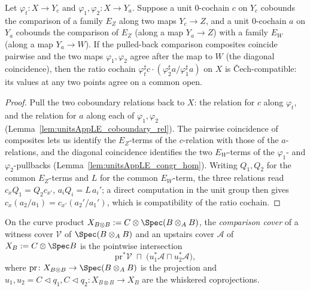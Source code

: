 \begin{lemma}
  \label{lem:ratio_compat}
  \leanok
  Let \(\varphi_t \colon X \to Y_c\) and \(\varphi_1, \varphi_2 \colon X \to Y_a\). Suppose a
  unit \(0\)-cochain \(c\) on \(Y_c\) cobounds the comparison of a family \(E_Z\) along two maps
  \(Y_c \to Z\), and a unit \(0\)-cochain \(a\) on \(Y_a\) cobounds the comparison of \(E_Z\)
  (along a map \(Y_a \to Z\)) with a family \(E_W\) (along a map \(Y_a \to W\)). If the
  pulled-back comparison composites coincide pairwise and the two maps \(\varphi_1, \varphi_2\)
  agree after the map to \(W\) (the diagonal coincidence), then the ratio cochain
  \(\varphi_t^{\sharp} c \cdot (\varphi_2^{\sharp} a / \varphi_1^{\sharp} a)\) on \(X\) is
  \v Cech-compatible: its values at any two points agree on a common open.
\end{lemma}
\begin{proof}
  \leanok
  Pull the two coboundary relations back to \(X\): the relation for \(c\) along \(\varphi_t\),
  and the relation for \(a\) along each of \(\varphi_1, \varphi_2\)
  (Lemma~\ref{lem:unitsAppLE_coboundary_rel}). The pairwise coincidence of composites lets us
  identify the \(E_Z\)-terms of the \(c\)-relation with those of the \(a\)-relations, and the
  diagonal coincidence identifies the two \(E_W\)-terms of the \(\varphi_1\)- and
  \(\varphi_2\)-pullbacks (Lemma~\ref{lem:unitsAppLE_congr_hom}). Writing \(Q_1, Q_2\) for the
  common \(E_Z\)-terms and \(L\) for the common \(E_W\)-term, the three relations read
  \(c_x Q_1 = Q_2 c_{x'}\), \(a_i Q_i = L\,a_i'\); a direct computation in the unit group then
  gives \(c_x (a_2/a_1) = c_{x'}(a_2'/a_1')\), which is compatibility of the ratio cochain.
\end{proof}

\begin{definition}
  \label{def:comparisonCover}
  \leanok
  On the curve product \(X_{B \otimes B} := C \otimes \Spec(B \otimes_A B)\), the
  \emph{comparison cover} of a witness cover \(\mathcal V\) of \(\Spec(B \otimes_A B)\) and an
  upstairs cover \(\mathcal A\) of \(X_B := C \otimes \Spec B\) is the pointwise intersection
  \[
    \mathrm{pr}^{*}\mathcal V \;\sqcap\; \bigl(u_1^{*}\mathcal A \sqcap u_2^{*}\mathcal A\bigr),
  \]
  where \(\mathrm{pr} \colon X_{B \otimes B} \to \Spec(B \otimes_A B)\) is the projection and
  \(u_1, u_2 = C \lhd q_1, C \lhd q_2 \colon X_{B \otimes B} \to X_B\) are the whiskered
  coprojections.
\end{definition}

